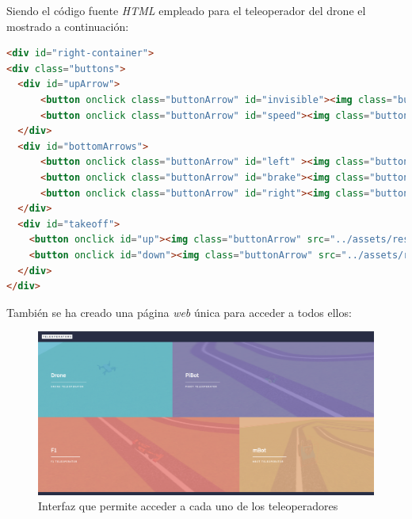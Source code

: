 Siendo el código fuente \textit{HTML} empleado para el teleoperador del drone el mostrado a continuación: 

\begin{lstlisting}[language=html,label=lst:teleop,caption=Código HTML del teleoperador del drone]
<div id="right-container">
<div class="buttons">
  <div id="upArrow">
      <button onclick class="buttonArrow" id="invisible"><img class="buttonArrow" src="../assets/resources/speed.svg" /></button>
      <button onclick class="buttonArrow" id="speed"><img class="buttonArrow" src="../assets/resources/speed.svg" /></button>
  </div>
  <div id="bottomArrows">
      <button onclick class="buttonArrow" id="left" ><img class="buttonArrow" src="../assets/resources/left.svg"/></button>
      <button onclick class="buttonArrow" id="brake"><img class="buttonArrow" src="../assets/resources/brake.svg"/></button>
      <button onclick class="buttonArrow" id="right"><img class="buttonArrow" src="../assets/resources/right.svg"/></button><br>
  </div>
  <div id="takeoff">
    <button onclick id="up"><img class="buttonArrow" src="../assets/resources/goUp.svg" /></button>
    <button onclick id="down"><img class="buttonArrow" src="../assets/resources/goDown.svg" /></button></button>
  </div>
</div>
\end{lstlisting}

También se ha creado una página \textit{web}  única para acceder a todos ellos: 

 \begin{figure}[H]
    \centering
    \includegraphics[scale=0.25]{img/teleoperators.png}
    \caption{Interfaz que permite acceder a cada uno de los teleoperadores} \label{fig:teleoperators}
\end{figure}

